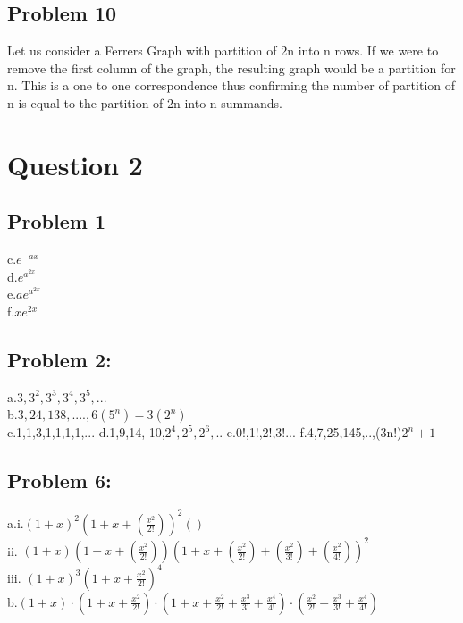 \documentclass[15pt]{article}
\begin{document}
\subsection*{Problem 10}
Let us consider a Ferrers Graph with partition of 2n into n rows. If we were to remove the first column of the graph, the resulting graph would be a partition for n. This is a one to one correspondence thus confirming the number of partition of n is equal to the partition of 2n into n summands.
\newpage
\section*{Question 2}
\subsection*{Problem 1}
c.$e^{-ax}$\\
d.$e^{a^{2x}}$\\
e.$ae^{a^{2x}}$\\
f.$xe^{2x}$\\
\subsection*{Problem 2:}
a.$3,3^2,3^3,3^4,3^5,...$\\
b.$3,24,138,....,6(5^n)- 3(2^n)$\\
c.1,1,3,1,1,1,1,...
d.1,9,14,-10,$2^4,2^5,2^6,..$
e.0!,1!,2!,3!...
f.4,7,25,145,..,(3n!)$2^n + 1$
\subsection*{Problem 6:}
a.i.${(1+x)}^2 (1+x+(\frac{{x^2}}{2!}))^2 ()$\\
ii. $(1+x)(1+x+(\frac{x^2}{2!}))(1+x+(\frac{x^2}{2!})+(\frac{x^2}{3!})+ (\frac{x^2}{4!}))^2$ \\
iii. ${(1+x)}^3(1+x+ \frac{x^2}{2!} )^4$\\
b.$(1+x)\cdot (1+x + \frac{x^2}{2!})\cdot (1+x + \frac{x^2}{2!}+  \frac{x^3}{3!} +  \frac{x^4}{4!}) \cdot ( \frac{x^2}{2!}+  \frac{x^3}{3!} +  \frac{x^4}{4!})$
\end{document}
